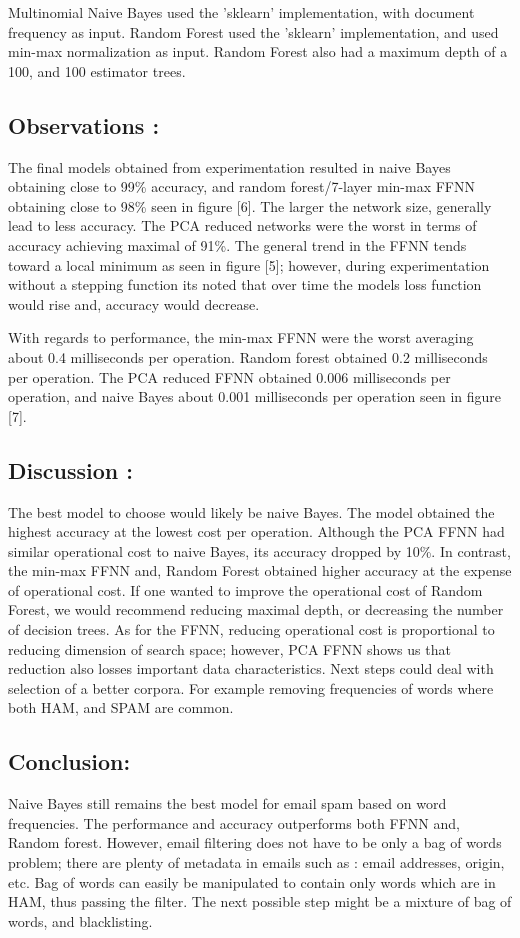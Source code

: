 \documentclass[a4paper,11pt]{article}
\begin{document}
Multinomial Naive Bayes used the 'sklearn' implementation, with document frequency as input.
Random Forest used the 'sklearn' implementation, and used min-max normalization as input. Random Forest also had a maximum depth of a 100, and 100 estimator trees. 

\subsection*{Observations : }
The final models obtained from experimentation resulted in naive Bayes obtaining close to 99\% accuracy, and random forest/7-layer min-max FFNN obtaining close to 98\% seen in figure [6]. The larger the network size, generally lead to less accuracy. The PCA reduced networks were the worst in terms of accuracy achieving maximal of 91\%.
The general trend in the FFNN tends toward a local minimum as seen in figure [5]; however, during experimentation without a stepping function its noted that over time the models loss function would rise and, accuracy would decrease.

With regards to performance, the min-max FFNN were the worst averaging about 0.4 milliseconds per operation. Random forest obtained 0.2 milliseconds per operation. The PCA reduced FFNN obtained 0.006  milliseconds per operation, and naive Bayes about 0.001 milliseconds per operation seen in figure [7].

\subsection*{Discussion : }
The best model to choose would likely be naive Bayes. The model obtained the highest accuracy at the lowest cost per operation. Although the PCA FFNN had similar operational cost to naive Bayes, its accuracy dropped by 10\%. In contrast, the min-max FFNN and, Random Forest obtained higher accuracy at the expense of operational cost. If one wanted to improve the operational cost of Random Forest, we would recommend reducing maximal depth, or decreasing the number of decision trees. As for the FFNN, reducing operational cost is proportional to reducing dimension of search space; however, PCA FFNN shows us that reduction also losses important data characteristics. Next steps could deal with selection of a better corpora. For example removing frequencies of words where both HAM, and SPAM are common. 

\subsection*{Conclusion:}
Naive Bayes still remains the best model for email spam based on word frequencies. 
The performance and accuracy outperforms both FFNN and, Random forest.
However, email filtering does not have to be only a bag of words problem; there are plenty of metadata in emails such as : email addresses, origin, etc.  Bag of words can easily be manipulated to contain only words which are in HAM, thus passing the filter. The next possible step might be a mixture of bag of words, and blacklisting. 
\end{document}
